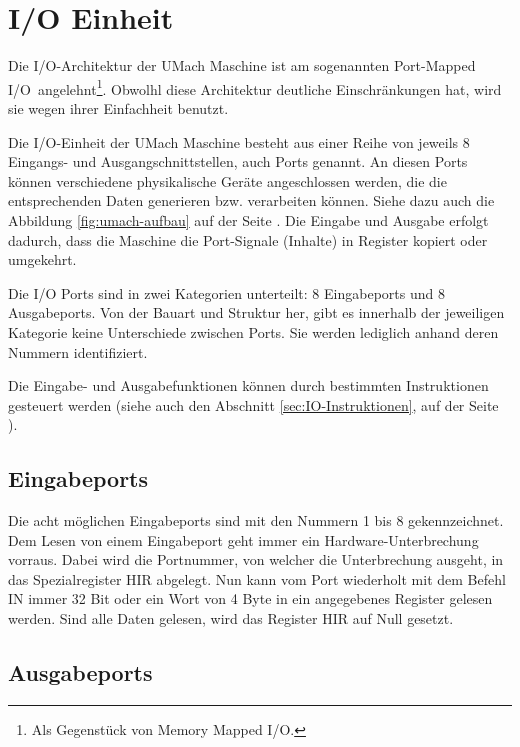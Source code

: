 \section{I/O Einheit}
\label{sec:IO-Einheit}

Die I/O-Architektur der UMach Maschine ist am sogenannten \glqq Port-Mapped
I/O\grqq\ angelehnt\footnote{Als Gegenstück von \glqq Memory Mapped I/O\grqq.}.
Obwolhl diese Architektur deutliche Einschränkungen hat, wird sie wegen ihrer
Einfachheit benutzt.


Die I/O-Einheit der UMach Maschine besteht aus einer Reihe von jeweils 8
Eingangs- und Ausgangschnittstellen, auch Ports
genannt. An diesen Ports können verschiedene physikalische Geräte angeschlossen
werden, die die entsprechenden Daten generieren bzw. verarbeiten können. Siehe
dazu auch die Abbildung \ref{fig:umach-aufbau} auf der Seite
\pageref{fig:umach-aufbau}. Die Eingabe und Ausgabe erfolgt dadurch, dass die
Maschine die Port-Signale (Inhalte) in Register kopiert oder umgekehrt.


Die I/O Ports sind in zwei Kategorien unterteilt: 8 Eingabeports und 8
Ausgabeports. Von der Bauart und Struktur her, gibt es innerhalb der jeweiligen
Kategorie keine Unterschiede zwischen Ports. Sie werden lediglich anhand deren
Nummern identifiziert.


Die Eingabe- und Ausgabefunktionen können durch bestimmten Instruktionen
gesteuert werden (siehe auch den Abschnitt \ref{sec:IO-Instruktionen}, auf der
Seite \pageref{sec:IO-Instruktionen}).



\subsection{Eingabeports}

Die acht möglichen Eingabeports sind mit den Nummern 1 bis 8 gekennzeichnet. Dem
Lesen von einem Eingabeport geht immer ein Hardware-Unterbrechung vorraus. Dabei
wird die Portnummer, von welcher die Unterbrechung ausgeht, in das
Spezialregister HIR abgelegt. Nun kann vom Port wiederholt mit dem Befehl IN
immer 32 Bit oder ein Wort von 4 Byte in ein angegebenes Register gelesen
werden. Sind alle Daten gelesen, wird das Register HIR auf Null gesetzt.

\subsection{Ausgabeports}
\label{subsec:Ausgabeports}

